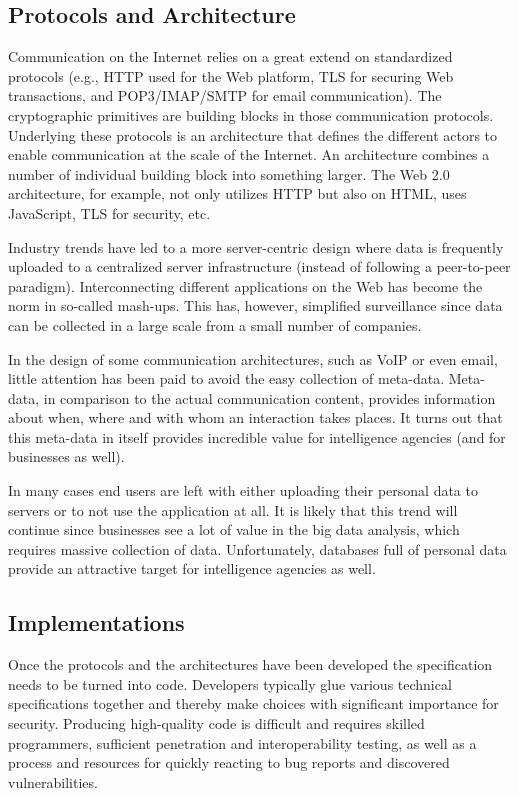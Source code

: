 \documentclass[peerreview, a4paper, 7pt]{IEEEtran}
\begin{document}
\subsection{Protocols and Architecture}

Communication on the Internet relies on a great extend on standardized protocols (e.g., HTTP used for the Web platform, TLS for securing Web transactions, and POP3/IMAP/SMTP for email communication). The cryptographic primitives are building blocks in those communication protocols. Underlying these protocols is an architecture that defines the different actors to enable communication at the scale of the Internet. An architecture combines a number of individual building block into something larger. The Web 2.0 architecture, for example, not only utilizes HTTP but also on HTML, uses JavaScript, TLS for security, etc. 

Industry trends have led to a more server-centric design where data is frequently uploaded to a centralized server infrastructure (instead of following a peer-to-peer paradigm). Interconnecting different applications on the Web has become the norm in so-called mash-ups. This has, however, simplified surveillance since data can be collected in a large scale from a small number of companies. 

In the design of some communication architectures, such as VoIP or even email, little attention has been paid to avoid the easy collection of meta-data. Meta-data, in comparison to the actual communication content, provides information about when, where and with whom an interaction takes places. It turns out that this meta-data in itself provides incredible value for intelligence agencies (and for businesses as well).

In many cases end users are left with either uploading their personal data to servers or to not use the application at all. It is likely that this trend will continue since businesses see a lot of value in the big data analysis, which requires massive collection of data. Unfortunately, databases full of personal data provide an attractive target for intelligence agencies as well.

\subsection{Implementations}

Once the protocols and the architectures have been developed the specification needs to be turned into code. Developers typically glue various technical specifications together and thereby make choices with significant importance for security. Producing high-quality code is difficult and requires skilled programmers, sufficient penetration and interoperability testing, as well as a process and resources for quickly reacting to bug reports and discovered vulnerabilities.  
\end{document}
